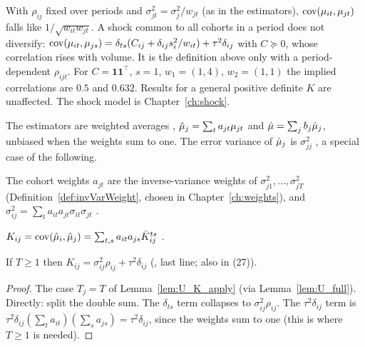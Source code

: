 \begin{remark}\label{rem:shock_volume}
  With $\rho_{ij}$ fixed over periods and $\sigma_{jt}^2 = \sigma_j^2/w_{jt}$ (as in the
  estimators), $\operatorname{cov}(\mu_{it}, \mu_{jt})$ falls like $1/\sqrt{w_{it}w_{jt}}$. A shock common to
  all cohorts in a period does not diversify:
  $\operatorname{cov}(\mu_{it}, \mu_{js}) = \delta_{ts}(C_{ij} + \delta_{ij}s_i^2/w_{it}) + \tau^2\delta_{ij}$
  with $C \succeq 0$, whose correlation rises with volume. It is the definition above only
  with a period-dependent $\rho_{ijt}$. For $C = \mathbf 1\mathbf 1^\top$, $s = 1$,
  $w_1 = (1, 4)$, $w_2 = (1, 1)$ the implied correlations are $0.5$ and $0.632$. Results for a
  general positive definite $K$ are unaffected. The shock model is Chapter~\ref{ch:shock}.
\end{remark}

The estimators are weighted averages ,
$\hat\mu_j = \sum_t a_{jt}\mu_{jt}$ and $\hat\mu = \sum_j b_j\hat\mu_j$, unbiased
when the weights sum to one. The error variance of $\hat\mu_j$ is
$\sigma_{jj}^2$ , a special case of the following.

\begin{definition}\label{def:sigma2}
  \leanok
  The cohort weights $a_{jt}$ are the inverse-variance weights of
  $\sigma_{j1}^2, \dots, \sigma_{jT}^2$ (Definition~\ref{def:invVarWeight},
  chosen in Chapter~\ref{ch:weights}), and
  $\sigma_{ij}^2 = \sum_t a_{it}a_{jt}\sigma_{it}\sigma_{jt}$ .
\end{definition}

\begin{definition}\label{def:K}
  \leanok
  $K_{ij} = \operatorname{cov}(\hat\mu_i, \hat\mu_j) = \sum_{t,s} a_{it}a_{js}\bar K_{ij}^{ts}$
  .
\end{definition}

\begin{lemma}[Entries of $K$]\label{lem:K_apply}
  \leanok
  If $T \ge 1$ then $K_{ij} = \sigma_{ij}^2\rho_{ij} + \tau^2\delta_{ij}$
  (, last line; also in (27)).
\end{lemma}
\begin{proof}
  \leanok
  The case $T_j = T$ of Lemma~\ref{lem:U_K_apply} (via Lemma~\ref{lem:U_full}).
  Directly: split the double sum. The $\delta_{ts}$ term collapses to
  $\sigma_{ij}^2\rho_{ij}$. The $\tau^2\delta_{ij}$ term is
  $\tau^2\delta_{ij}(\sum_t a_{it})(\sum_s a_{js}) = \tau^2\delta_{ij}$, since
  the weights sum to one (this is where $T \ge 1$ is needed).
\end{proof}

